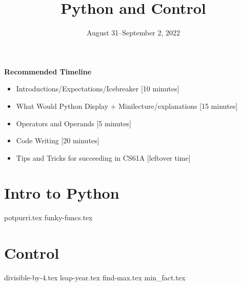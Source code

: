 \documentclass{exam}
\title{Python and Control}
\date{August 31--September 2, 2022}
\begin{document}
\maketitle
\begin{guide}
\textbf{Recommended Timeline}
\begin{itemize}
  \item Introductions/Expectations/Icebreaker [10 minutes]
  \item What Would Python Display + Minilecture/explanations [15 minutes]
  \item Operators and Operands [5 minutes]
  \item Code Writing [20 minutes]
  \item Tips and Tricks for succeeding in CS61A [leftover time]
\end{itemize}
\end{guide}


\section{Intro to Python}
\begin{questions}
{potpurri.tex}
{funky-funcs.tex}
\end{questions}

\section{Control}
\begin{questions}
{divisible-by-4.tex}
{leap-year.tex}
{find-max.tex}
{min_fact.tex}
\end{questions}
\end{document}
